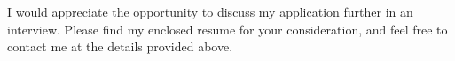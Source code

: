 \begin{cvletter}
  I would appreciate the opportunity to discuss my application further in an interview. 
  Please find my enclosed resume for your consideration, 
  and feel free to contact me at the details provided above.
%   
%   
% 
% 
% 

\end{cvletter}


\makeletterclosing
